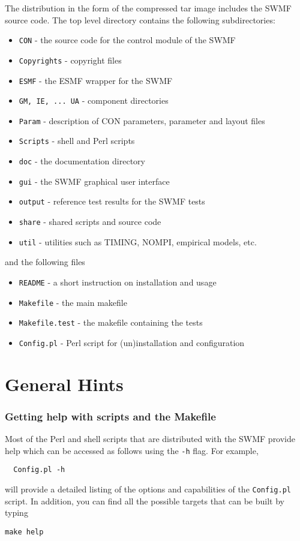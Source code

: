 The distribution in the form of the compressed tar image
includes the SWMF source code.
The top level directory contains the following subdirectories:
\begin{itemize}\itemsep=0pt
\item {\tt CON}     - the source code for the control module of the SWMF
\item {\tt Copyrights} - copyright files
\item {\tt ESMF}    - the ESMF wrapper for the SWMF
\item {\tt GM, IE, ... UA} - component directories
\item {\tt Param}   - description of CON parameters, parameter and layout files
\item {\tt Scripts} - shell and Perl scripts
\item {\tt doc}     - the documentation directory %
\item {\tt gui}     - the SWMF graphical user interface
\item {\tt output}  - reference test results for the SWMF tests
\item {\tt share}   - shared scripts and source code
\item {\tt util}    - utilities such as TIMING, NOMPI, empirical models, etc.
\end{itemize}
and the following files
\begin{itemize}\itemsep=0pt
\item {\tt README}        - a short instruction on installation and usage
\item {\tt Makefile}      - the main makefile
\item {\tt Makefile.test} - the makefile containing the tests %
\item {\tt Config.pl}     - Perl script for (un)installation and configuration
\end{itemize}

\section{General Hints}

\subsubsection{Getting help with scripts and the Makefile}

Most of the Perl and shell scripts that are distributed with the SWMF
provide help which can be accessed as follows using the {\tt -h} flag.
For example, 
\begin{verbatim}
  Config.pl -h
\end{verbatim}
will provide a detailed listing of the options and capabilities of the
{\tt Config.pl} script.  In addition, you can find all the possible
targets  that can be built by typing
\begin{verbatim}
make help
\end{verbatim}

